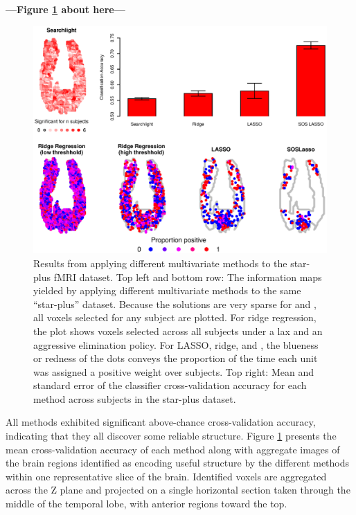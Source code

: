 \begin{center}
\textbf{---Figure \ref{fig.brain} about here---}
\end{center}

\begin{figure}
\centering
\includegraphics[width=.9\textwidth]{figures/figure10.eps}
\caption{Results from applying different multivariate methods to the star-plus fMRI dataset. Top left and bottom row: The information maps yielded by applying different multivariate methods to the same ``star-plus'' dataset. Because the solutions are very sparse for {\lasso} and {\soslasso}, all voxels selected for any subject are plotted. For ridge regression, the plot shows voxels selected across all subjects under a lax and an aggressive elimination policy. For LASSO, ridge, and {\soslasso}, the blueness or redness of the dots conveys the proportion of the time each unit was assigned a positive weight over subjects. Top right: Mean and standard error of the classifier cross-validation accuracy for each method across subjects in the star-plus dataset.}
\label{fig.brain}  
\end{figure}

All methods exhibited significant above-chance cross-validation accuracy, indicating that they all discover some reliable structure. Figure \ref{fig.brain} presents the mean cross-validation accuracy of each method along with aggregate images of the brain regions identified as encoding useful structure by the different methods within one representative slice of the brain.  Identified voxels are aggregated across the Z plane and projected on a single horizontal section taken through the middle of the temporal lobe, with anterior regions toward the top. 

